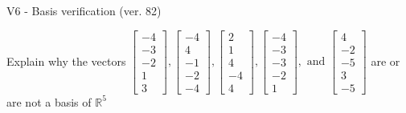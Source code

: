 \begin{exercise}
  \begin{exerciseTitle}V6 - Basis verification (ver. 82)\end{exerciseTitle}
  \begin{exerciseStatement}
    Explain why the vectors \(\left[\begin{array}{r}
-4 \\
-3 \\
-2 \\
1 \\
3
\end{array}\right] , \left[\begin{array}{r}
-4 \\
4 \\
-1 \\
-2 \\
-4
\end{array}\right] , \left[\begin{array}{r}
2 \\
1 \\
4 \\
-4 \\
4
\end{array}\right] , \left[\begin{array}{r}
-4 \\
-3 \\
-3 \\
-2 \\
1
\end{array}\right] , \text{ and } \left[\begin{array}{r}
4 \\
-2 \\
-5 \\
3 \\
-5
\end{array}\right]\) are or are not a basis of \(\mathbb{R}^5\)	



\end{exerciseStatement}
\end{exercise}
